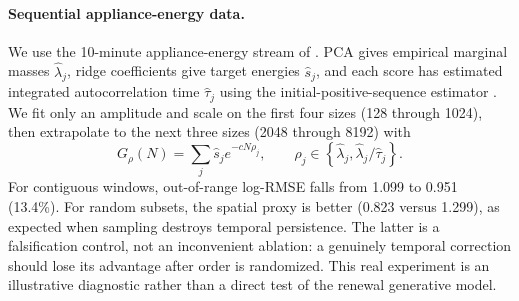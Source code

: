 \paragraph{Sequential appliance-energy data.}
We use the 10-minute appliance-energy stream of
\citet{candanedo2017appliances}.  PCA gives empirical marginal masses
$\widehat\lambda_j$, ridge coefficients give target energies
$\widehat s_j$, and each score has estimated integrated autocorrelation time
$\widehat\tau_j$ using the initial-positive-sequence estimator
\cite{geyer1992practical}.  We fit only an amplitude and scale on the first
four sizes (128 through 1024), then extrapolate to the next three sizes (2048
through 8192) with
\begin{equation}
G_\rho(N)=\sum_j\widehat s_j e^{-cN\rho_j},
\qquad
\rho_j\in\left\{\widehat\lambda_j,
\widehat\lambda_j/\widehat\tau_j\right\}.
\label{eq:real-proxy}
\end{equation}
For contiguous windows, out-of-range log-RMSE falls from 1.099 to 0.951
(13.4\%).  For random subsets, the spatial proxy is better (0.823 versus
1.299), as expected when sampling destroys temporal persistence.  The latter
is a falsification control, not an inconvenient ablation: a genuinely temporal
correction should lose its advantage after order is randomized.  This real
experiment is an illustrative diagnostic rather than a direct test of the
renewal generative model.
